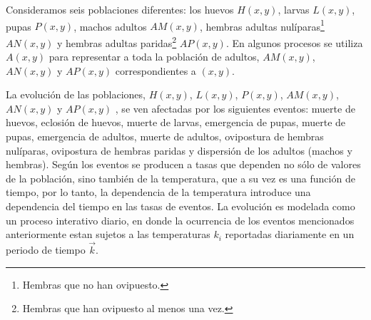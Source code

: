Consideramos seis poblaciones diferentes: los huevos $H(x,y)$, larvas $L(x,y)$, pupas $P(x,y)$,
machos adultos $AM(x,y)$, hembras adultas nulíparas\footnote{Hembras que no han ovipuesto.}
$AN(x,y)$ y hembras adultas paridas\footnote{Hembras que han ovipuesto al menos una vez.} $AP(x,y)$. En algunos procesos se utiliza $A(x, y)$ para representar a toda la población de adultos,
$AM(x,y)$, $AN(x,y)$ y $AP(x,y)$ correspondientes a $(x, y)$.

La evolución de las poblaciones, $H(x,y)$, $L(x,y)$, $P(x,y)$, $AM(x,y)$, $AN(x,y)$ y $AP(x,y)$ ,
se ven afectadas por los siguientes eventos: muerte de huevos, eclosión de huevos, muerte de
larvas, emergencia de pupas, muerte de pupas, emergencia de adultos, muerte de adultos, ovipostura
de hembras nulíparas, ovipostura de hembras paridas y dispersión de los adultos (machos y hembras).
Según \citet{otero2006stochastic} los eventos se producen a tasas que dependen no sólo de valores
de la población, sino también de la temperatura, que a su vez es una función de tiempo, por lo
tanto, la dependencia de la temperatura introduce una dependencia del tiempo en las tasas de
eventos. La evolución es modelada como un proceso interativo diario, en donde la ocurrencia de los
eventos mencionados anteriormente estan sujetos a las temperaturas $k_{i}$ reportadas diariamente
en un periodo de tiempo $\vec{k}$.







